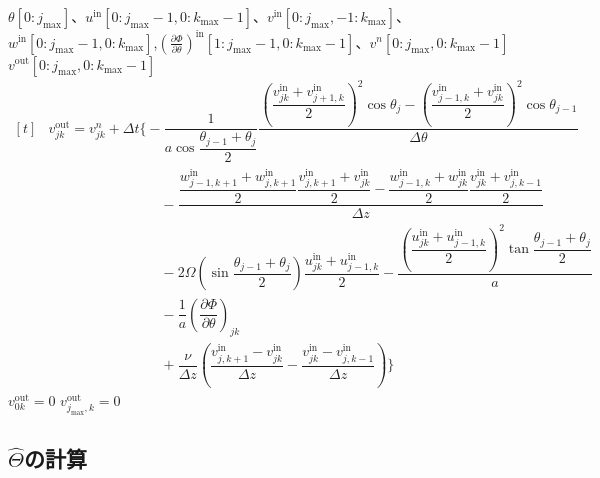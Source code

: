 \documentclass[ja=standard,xelatex]{bxjsarticle}
\newcommand{\pdif}[2]{\dfrac{\partial{#1}}{\partial#2}}
\newcommand{\bracketnormal}[1]{\left(#1\right)}
\begin{document}
\begin{algorithm}[H]
  \caption*{\textbf{subroutine:} update\_v}
  \begin{algorithmic}[1]
    \Require $\theta[0:j_\text{max}]$、$u^\text{in}[0:j_\text{max}-1,0:k_\text{max}-1]$、$v^\text{in}[0:j_\text{max},-1:k_\text{max}]$、$w^\text{in}[0:j_\text{max}-1,0:k_\text{max}]$,$\bracketnormal{\frac{\partial\Phi}{\partial\theta}}^\text{in}[1:j_\text{max}-1,0:k_\text{max}-1]$、$v^n[0:j_\text{max},0:k_\text{max}-1]$
    \Ensure $v^\text{out}[0:j_\text{max},0:k_\text{max}-1]$
    \Statex
      \State $\begin{aligned}[t]
        &v_{jk}^\text{out} = v_{jk}^n + \Delta t\Bigg\{-\dfrac{1}{a\cos\dfrac{\theta_{j-1}+\theta_{j}}{2}}\dfrac{\bracketnormal{\dfrac{v^\text{in}_{jk}+v^\text{in}_{j+1,k}}{2}}^2\cos\theta_j - \bracketnormal{\dfrac{v^\text{in}_{j-1,k}+v^\text{in}_{jk}}{2}}^2\cos\theta_{j-1} }{\Delta\theta}\\[5pt]
        &\qquad\qquad\qquad\qquad - \dfrac{\dfrac{w^\text{in}_{j-1,k+1}+w^\text{in}_{j,k+1}}{2}\dfrac{v^\text{in}_{j,k+1}+v^\text{in}_{jk}}{2}-\dfrac{w^\text{in}_{j-1,k}+w^\text{in}_{jk}}{2}\dfrac{v^\text{in}_{jk}+v^\text{in}_{j,k-1}}{2}}{\Delta z}\\[5pt]
        &\qquad\qquad\qquad\qquad-2\Omega\bracketnormal{\sin\dfrac{\theta_{j-1}+\theta_{j}}{2}}\dfrac{u^\text{in}_{jk}+u^\text{in}_{j-1,k}}{2}-\dfrac{\bracketnormal{\dfrac{u^\text{in}_{jk}+u^\text{in}_{j-1,k}}{2}}^2\tan\dfrac{\theta_{j-1}+\theta_{j}}{2}}{a}\\[5pt]
        &\qquad\qquad\qquad\qquad -\dfrac{1}{a}\bracketnormal{\pdif{\Phi}{\theta}}_{jk}\\[5pt]
        &\qquad\qquad\qquad\qquad +\dfrac{\nu}{\Delta z}\bracketnormal{\dfrac{v^\text{in}_{j,k+1}-v^\text{in}_{jk}}{\Delta z} - \dfrac{v^\text{in}_{jk}-v^\text{in}_{j,k-1}}{\Delta z}}\Bigg\}
      \end{aligned}$
    \EndDo
    \EndDo
    \State {}
    \State $v^\text{out}_{0k}=0$
    \State $v^\text{out}_{j_\text{max},k}=0$
    \EndDo

  \end{algorithmic}
\end{algorithm}

\subsection{\texorpdfstring{$\hat{\Theta}$の計算}{温位の計算}}
\end{document}
